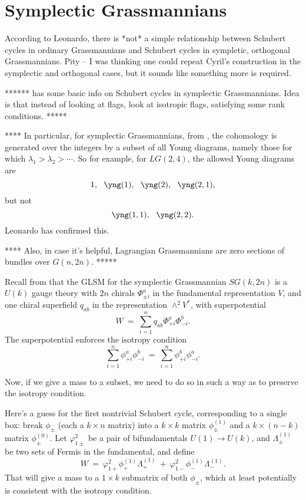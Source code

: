 \documentclass[12pt]{article}
\begin{document}
\section{Symplectic Grassmannians}

According to Leonardo, there is *not* a simple relationship between
Schubert cycles in ordinary Grassmannians
and Schubert cycles in sympletic, orthogonal Grassmannians.
Pity -- I was thinking one could repeat Cyril's construction in the
symplectic and orthogonal cases, but it sounds like something more
is required.


****** \cite{bkt} has some basic info on Schubert cycles in symplectic
Grassmannians.  Idea is that instead of looking at flags,
look at isotropic flags, satisfying some rank conditions.
*****

**** In particular, for symplectic Grassmannians, from 
\cite[section 1.1]{bkt}, the cohomology is generated over the
integers by a subset of all Young diagrams, namely those for which
$\lambda_1 > \lambda_2 > \cdots$.  So for example, for $LG(2,4)$,
the allowed Young diagrams are
\begin{equation}
1, \: \: \:
\yng(1), \: \: \:
\yng(2), \: \: \:
\yng(2,1),
\end{equation}
but not
\begin{equation}
\yng(1,1), \: \: \:
\yng(2,2).
\end{equation}
Leonardo has confirmed this.

**** Also, in case it's helpful, Lagrangian Grassmannians are zero sections
of bundles over $G(n,2n)$. *****


Recall from \cite{Gu:2020oeb} that the GLSM for the symplectic
Grassmannian $SG(k,2n)$ is a $U(k)$ gauge theory with 
$2n$ chirals $\Phi^a_{\pm i}$ in the fundamental representation $V$,
and one chiral superfield $q_{ab}$ in the representation $\wedge^2 V^*$,
with superpotential
\begin{equation}
W \: = \: \sum_{i=1}^n q_{ab} \Phi^a_{+i} \Phi^b_{-i}.
\end{equation}
The superpotential enforces the isotropy condition
\begin{equation}
\sum_{i=1}^n \phi^a_{+i} \phi^b_{-i} \: = \:
\sum_{i=1}^n \phi^b_{+i} \phi^a_{-i}.
\end{equation}

Now, if we give a mass to a subset, we need to do so in such a way
as to preserve the isotropy condition.

Here's a guess for the first nontrivial Schubert cycle, corresponding
to a single box:
break $\phi_{\pm}$ (each a $k \times n$ matrix)
into a $k \times k$ matrix $\phi_{\pm}^{(1)}$ and a 
$k \times (n-k)$ matrix $\phi_{\pm}^{(0)}$.
Let $\varphi_{1 \pm}^2$ be a pair of bifundamentals $U(1) \rightarrow U(k)$,
and $\Lambda_{\pm}^{(1)}$ be two sets of Fermis in the fundamental,
and define
\begin{equation}
W \: = \: \varphi_{1+}^2 \phi^{(1)}_+ \Lambda^{(1)}_+ \: + \:
\varphi_{1-}^2 \phi^{(1)}_- \Lambda^{(1)}_-.
\end{equation}
That will give a mass to a $1\times k$ submatrix of both
$\phi_{\pm}$, which at least potentially is consistent with the isotropy
condition.
\end{document}
